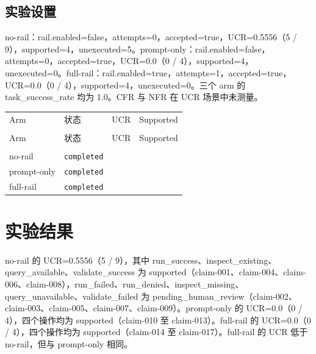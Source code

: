 \documentclass[UTF8]{ctexart}
\begin{document}
\subsection{实验设置}
no-\allowbreak{}rail：rail.enabled=false，attempts=0，accepted=true，UCR=0.5556（5 / 9），supported=4，unexecuted=5。prompt-\allowbreak{}only：rail.enabled=false，attempts=0，accepted=true，UCR=0.0（0 / 4），supported=4，unexecuted=0。full-\allowbreak{}rail：rail.enabled=true，attempts=1，accepted=true，UCR=0.0（0 / 4），supported=4，unexecuted=0。三个 arm 的 task\_\allowbreak{}success\_\allowbreak{}rate 均为 1.0。CFR 与 NFR 在 UCR 场景中未测量。
\begin{longtable}{@{}>{\raggedright\arraybackslash}p{}>{\raggedright\arraybackslash}p{}>{\raggedleft\arraybackslash}p{}>{\raggedleft\arraybackslash}p{}@{}}
\toprule
Arm & 状态 & UCR & Supported\\\\
\midrule
\endfirsthead
\toprule
Arm & 状态 & UCR & Supported\\\\
\midrule
\endhead
no-\allowbreak{}rail & \texttt{\scriptsize completed} & 0.5556 & 4 \\
prompt-\allowbreak{}only & \texttt{\scriptsize completed} & 0.0 & 4 \\
full-\allowbreak{}rail & \texttt{\scriptsize completed} & 0.0 & 4 \\
\bottomrule
\end{longtable}
\section{实验结果}
no-\allowbreak{}rail 的 UCR=0.5556（5 / 9），其中 run\_\allowbreak{}success、inspect\_\allowbreak{}existing、query\_\allowbreak{}available、validate\_\allowbreak{}success 为 supported（claim-\allowbreak{}001、claim-\allowbreak{}004、claim-\allowbreak{}006、claim-\allowbreak{}008），run\_\allowbreak{}failed、run\_\allowbreak{}denied、inspect\_\allowbreak{}missing、query\_\allowbreak{}unavailable、validate\_\allowbreak{}failed 为 pending\_\allowbreak{}human\_\allowbreak{}review（claim-\allowbreak{}002、claim-\allowbreak{}003、claim-\allowbreak{}005、claim-\allowbreak{}007、claim-\allowbreak{}009）。prompt-\allowbreak{}only 的 UCR=0.0（0 / 4），四个操作均为 supported（claim-\allowbreak{}010 至 claim-\allowbreak{}013）。full-\allowbreak{}rail 的 UCR=0.0（0 / 4），四个操作均为 supported（claim-\allowbreak{}014 至 claim-\allowbreak{}017）。full-\allowbreak{}rail 的 UCR 低于 no-\allowbreak{}rail，但与 prompt-\allowbreak{}only 相同。
\end{document}
